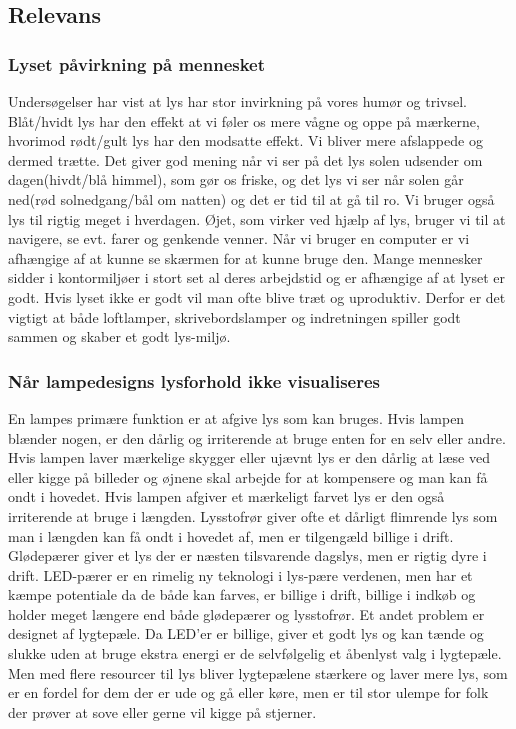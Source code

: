 \subsection{Relevans}
\subsubsection{Lyset påvirkning på mennesket}

Undersøgelser har vist at lys har stor invirkning på vores humør og trivsel.
Blåt/hvidt lys har den effekt at vi føler os mere vågne og oppe på mærkerne\cite{videnskab_dk_paavirkning},
hvorimod rødt/gult lys har den modsatte effekt. Vi bliver mere afslappede og dermed trætte.
Det giver god mening når vi ser på det lys solen udsender om dagen(hivdt/blå himmel), som gør os friske, og det 
lys vi ser når solen går ned(rød solnedgang/bål om natten) og det er tid til at gå til ro.
Vi bruger også lys til rigtig meget i hverdagen. Øjet, som virker ved hjælp af lys\cite{optikerforeningen_synet},
bruger vi til at navigere, se evt. farer og genkende venner. Når vi bruger en computer er vi afhængige 
af at kunne se skærmen for at kunne bruge den. 
Mange mennesker sidder i kontormiljøer i stort set al deres arbejdstid og er afhængige af at lyset er godt.
Hvis lyset ikke er godt vil man ofte blive træt og uproduktiv. Derfor er det vigtigt at både loftlamper, 
skrivebordslamper og indretningen spiller godt sammen og skaber et godt lys-miljø.


\subsubsection{Når lampedesigns lysforhold ikke visualiseres}

En lampes primære funktion er at afgive lys som kan bruges. Hvis lampen blænder nogen, er den dårlig og irriterende
at bruge enten for en selv eller andre. Hvis lampen laver mærkelige skygger eller ujævnt lys er den dårlig at læse ved 
eller kigge på billeder og øjnene skal arbejde for at kompensere og man kan få ondt i hovedet.
Hvis lampen afgiver et mærkeligt farvet lys er den også irriterende at bruge i længden. 
Lysstofrør giver ofte et dårligt flimrende lys som man i længden kan få ondt i hovedet af, men er tilgengæld billige i drift.
Glødepærer giver et lys der er næsten tilsvarende dagslys, men er rigtig dyre i drift\cite{videnskab_dk_led}.
LED-pærer er en rimelig ny teknologi i lys-pære verdenen, men har et kæmpe potentiale da de både kan farves,
er billige i drift, billige i indkøb og holder meget længere end både glødepærer og lysstofrør.
Et andet problem er designet af lygtepæle. Da LED'er er billige, giver et godt lys og kan tænde og slukke 
uden at bruge ekstra energi er de selvfølgelig et åbenlyst valg i lygtepæle. Men med flere resourcer til lys bliver 
lygtepælene stærkere og laver mere lys, som er en fordel for dem der er ude og gå eller køre, men er til stor ulempe 
for folk der prøver at sove eller gerne vil kigge på stjerner\cite{dr_dk_lysforurening}.
